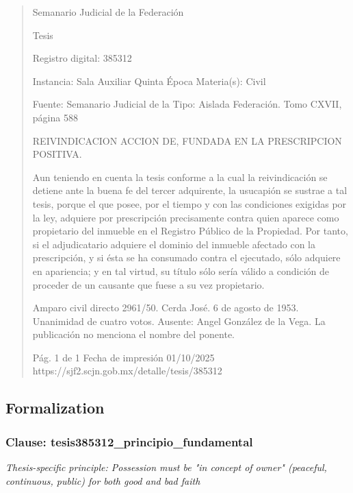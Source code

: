\documentclass[11pt,a4paper]{article}
\begin{document}
\begin{quote}
                                                   Semanario Judicial de la Federación

                                                  Tesis

 Registro digital: 385312

 Instancia: Sala Auxiliar         Quinta Época                         Materia(s): Civil

                                  Fuente: Semanario Judicial de la     Tipo: Aislada
                                  Federación.
                                  Tomo CXVII, página 588


REIVINDICACION ACCION DE, FUNDADA EN LA PRESCRIPCION POSITIVA.


Aun teniendo en cuenta la tesis conforme a la cual la reivindicación se detiene ante la buena fe del
tercer adquirente, la usucapión se sustrae a tal tesis, porque el que posee, por el tiempo y con las
condiciones exigidas por la ley, adquiere por prescripción precisamente contra quien aparece como
propietario del inmueble en el Registro Público de la Propiedad. Por tanto, si el adjudicatario
adquiere el dominio del inmueble afectado con la prescripción, y si ésta se ha consumado contra el
ejecutado, sólo adquiere en apariencia; y en tal virtud, su título sólo sería válido a condición de
proceder de un causante que fuese a su vez propietario.


Amparo civil directo 2961/50. Cerda José. 6 de agosto de 1953. Unanimidad de cuatro votos.
Ausente: Angel González de la Vega. La publicación no menciona el nombre del ponente.




                                             Pág. 1 de 1             Fecha de impresión 01/10/2025
  https://sjf2.scjn.gob.mx/detalle/tesis/385312

\end{quote}

\subsection{Formalization}

\subsubsection{Clause: tesis385312\_principio\_fundamental}

\textit{Thesis-specific principle: Possession must be "in concept of owner" (peaceful, continuous, public) for both good and bad faith}
\end{document}
